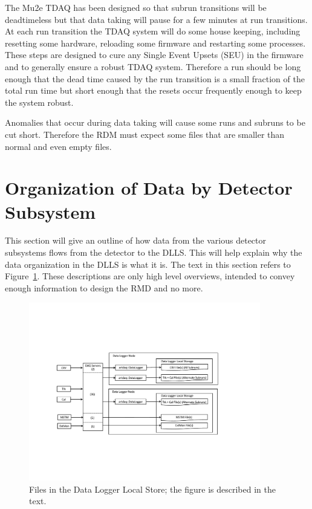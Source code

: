 The Mu2e TDAQ has been designed so that subrun transitions will be deadtimeless
but that data taking will pause for a few minutes at run transitions.
At each run transition the TDAQ system will do some house keeping,
including resetting some hardware, reloading some firmware and restarting some processes.
These steps are designed to cure any Single Event Upsets (SEU) in the firmware
and to generally ensure a robust TDAQ system.
Therefore a run should be long enough that the dead time
caused by the run transition is a small fraction of the total run time
but short enough that the resets occur frequently enough
to keep the system robust.

Anomalies that occur during data taking will cause some runs
and subruns to be cut short.
Therefore the RDM must expect some files that are smaller than normal
and even empty files.


\section{Organization of Data by Detector Subsystem }
\label{ssec:dataOrganization}

This section will give an outline of how data from the
various detector subsystems flows from the detector to the DLLS.
This will help explain why the data organization in the DLLS is what it is.
The text in this section refers to Figure~\ref{fig:filesDLLS}.
These descriptions are only high level overviews,
intended to convey enough information to design the RMD and no more.


\begin{figure}[tbp]
\centering
\includegraphics[width=0.9\textwidth]{figures/FilesInDLLS.pdf}
\caption[Files in the DLLS]{
  Files in the Data Logger Local Store; the figure is described in the text.}
\label{fig:filesDLLS}
\end{figure}


